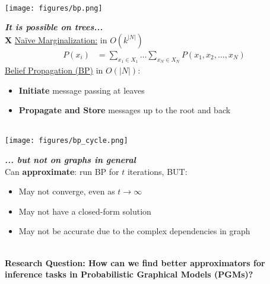 \documentclass[a0paper,portrait]{baposter}
\begin{document}
\begin{poster}
{\begin{minipage}[t]{0.20\textwidth}
    \centering\textbf{} \\
    \texttt{[image: figures/bp.png]} %
\end{minipage}%
\hfill
\begin{minipage}[t]{0.25\textwidth}
    \textbf{\textit{It is possible on trees...}}
    \vspace{2pt} \\
    \textbf{X} \uline{{Naïve Marginalization:}} in $O(k^{|N|})$ 
    \begin{align}
        P(x_i) &= \sum_{x_1 \in X_1}\ldots \sum_{x_{N} \in X_{N}} P(x_1, x_2, \ldots, x_{N}) \nonumber
    \end{align}
    \checkmark \uline{Belief Propagation (BP)} in  $O(|N|)$:
    \begin{itemize}[itemsep=.5pt]
        \item \textbf{Initiate} message passing at leaves
        \item \textbf{Propagate and Store} messages up to the root and back
    \end{itemize} 
\end{minipage}
\hfill
\begin{minipage}[t]{0.18\textwidth}
    \centering\textbf{} \\
    \texttt{[image: figures/bp\_cycle.png]} %
\end{minipage}%
\hfill
\begin{minipage}[t]{0.3\textwidth}
\textbf{\textit{... but not on graphs in general}}
\vspace{1pt} \\
 Can \textbf{approximate}: run BP for $t$ iterations, BUT:
\begin{itemize}
    \item May not converge, even as $t \to \infty$ 
    \item May not have a closed-form solution 
    \item May not be accurate due to the complex dependencies in graph 
\end{itemize} 
\end{minipage} \\
\centering \textbf{Research Question: How can we find better approximators for inference tasks in Probabilistic Graphical Models (PGMs)?}
}



\end{poster}
\end{document}
